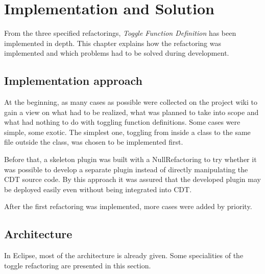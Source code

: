 \chapter{Implementation and Solution}
\thispagestyle{fancy}

From the three specified refactorings, \textit{Toggle Function Definition} has 
been implemented in depth. This chapter explains how the refactoring was 
implemented and which problems had to be solved during development.

\section{Implementation approach}

At the beginning, as many cases as possible were collected on the project wiki 
to gain a view on what had to be realized, what was planned to take into scope 
and what had nothing to do with toggling function definitions. Some cases were 
simple, some exotic. The simplest one, toggling from inside a class to the same 
file outside the class, was chosen to be implemented first. 

Before that, a skeleton plugin was built with a NullRefactoring to try whether 
it was possible to develop a separate plugin instead of directly manipulating 
the CDT source code. By this approach it was assured that the developed plugin 
may be deployed easily even without being integrated into CDT.

After the first refactoring was implemented, more cases were added by priority. 

\section{Architecture}

In Eclipse, most of the architecture is already given. Some specialities of the 
toggle refactoring are presented in this section.

